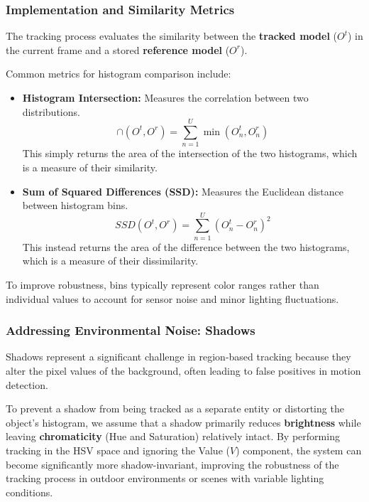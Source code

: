 \subsubsection{Implementation and Similarity Metrics}
The tracking process evaluates the similarity between the \textbf{tracked model} ($O^t$) 
in the current frame and a stored \textbf{reference model} ($O^r$). 

Common metrics for histogram comparison include:
\begin{itemize}
    \item \textbf{Histogram Intersection:} Measures the correlation between two distributions.
    \[ \cap (O^t, O^r) = \sum_{n=1}^{U} \min(O^t_{n}, O^r_{n}) \]
    This simply returns the area of the intersection of the two histograms, which is a measure of their similarity.
    \item \textbf{Sum of Squared Differences (SSD):} Measures the Euclidean distance between histogram bins.
    \[ SSD(O^t, O^r) = \sum_{n=1}^{U} (O^t_{n} - O^r_{n})^2 \]
    This instead returns the area of the difference between the two histograms, which is a measure of their dissimilarity.
\end{itemize}

To improve robustness, bins typically represent color ranges rather than individual 
values to account for sensor noise and minor lighting fluctuations.

\subsubsection{Addressing Environmental Noise: Shadows}
Shadows represent a significant challenge in region-based tracking because 
they alter the pixel values of the background, often leading to false positives in motion detection. 

To prevent a shadow from being tracked as a separate entity or distorting the object's histogram, 
we assume that a shadow primarily reduces \textbf{brightness} while leaving \textbf{chromaticity} (Hue and Saturation) relatively intact. 
By performing tracking in the HSV space and ignoring the Value ($V$) component, 
the system can become significantly more shadow-invariant, improving the robustness of the tracking process in outdoor 
environments or scenes with variable lighting conditions.

